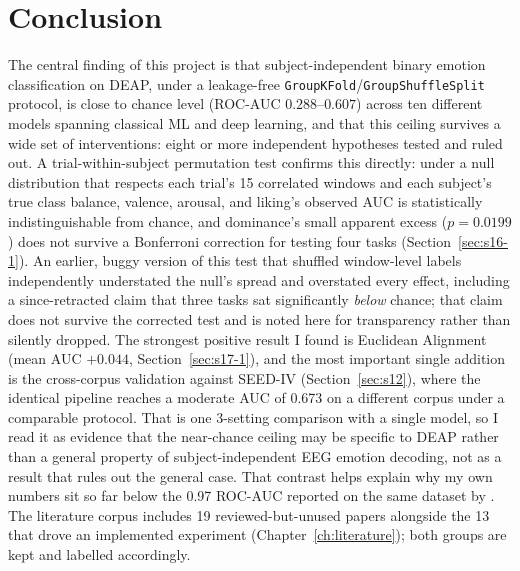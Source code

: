 \documentclass[11pt]{report}
\begin{document}
\chapter{Conclusion}
\label{ch:conclusion}

The central finding of this project is that subject-independent binary
emotion classification on DEAP, under a leakage-free
\texttt{GroupKFold}/\texttt{GroupShuffleSplit} protocol, is close to
chance level (ROC-AUC $0.288$--$0.607$) across ten different models
spanning classical ML and deep learning, and that this ceiling survives a
wide set of interventions: eight or more independent hypotheses tested and
ruled out. A trial-within-subject permutation test confirms this directly:
under a null distribution that respects each trial's 15 correlated windows
and each subject's true class balance, valence, arousal, and liking's
observed AUC is statistically indistinguishable from chance, and
dominance's small apparent excess ($p=0.0199$) does not survive a
Bonferroni correction for testing four tasks (Section~\ref{sec:s16-1}). An
earlier, buggy version of this test that shuffled window-level labels
independently understated the null's spread and overstated every effect,
including a since-retracted claim that three tasks sat significantly
\emph{below} chance; that claim does not survive the corrected test and is
noted here for transparency rather than silently dropped.
The strongest positive result I found is Euclidean Alignment (mean AUC
$+0.044$, Section~\ref{sec:s17-1}), and the most important single addition
is the cross-corpus validation against SEED-IV (Section~\ref{sec:s12}),
where the identical pipeline reaches a moderate AUC of 0.673 on a different
corpus under a comparable protocol. That is one 3-setting comparison with a
single model, so I read it as evidence that the near-chance ceiling may be
specific to DEAP rather than a general property of subject-independent EEG
emotion decoding, not as a result that rules out the general case. That
contrast helps explain why my own numbers sit so far below the 0.97 ROC-AUC
reported on the same dataset by \citet{hasan2025methodsx}. The literature
corpus includes 19 reviewed-but-unused papers alongside the 13 that drove
an implemented experiment (Chapter~\ref{ch:literature}); both groups are
kept and labelled accordingly.
\end{document}
